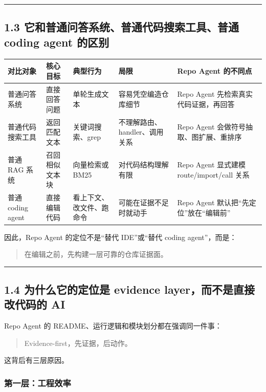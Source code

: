 \documentclass[UTF8,12pt,openany]{ctexbook}
\begin{document}
\hrule

\subsection{1.3 它和普通问答系统、普通代码搜索工具、普通 coding agent 的区别}

\begin{center}
\small
\begin{longtable}{|p{}|p{}|p{}|p{}|p{}|}
\toprule
对比对象 & 核心目标 & 典型行为 & 局限 & Repo Agent 的不同点 \\
\midrule
普通问答系统 & 直接回答问题 & 单轮生成文本 & 容易凭空编造仓库细节 & Repo Agent 先检索真实代码证据，再回答 \\
普通代码搜索工具 & 返回匹配文本 & 关键词搜索、grep & 不理解路由、handler、调用关系 & Repo Agent 会做符号抽取、图扩展、重排序 \\
普通 RAG 系统 & 召回相似文本块 & 向量检索或 BM25 & 对代码结构理解有限 & Repo Agent 显式建模 route/import/call 关系 \\
普通 coding agent & 直接编辑代码 & 看上下文、改文件、跑命令 & 可能在证据不足时就动手 & Repo Agent 默认把“先定位”放在“编辑前” \\
\bottomrule
\end{longtable}
\end{center}

因此，Repo Agent 的定位不是“替代 IDE”或“替代 coding agent”，而是：\par

\begin{quote}
在编辑之前，先构建一层可靠的仓库证据面。
\end{quote}

\hrule

\subsection{1.4 为什么它的定位是 evidence layer，而不是直接改代码的 AI}

Repo Agent 的 README、运行逻辑和模块划分都在强调同一件事：\par

\begin{quote}
Evidence-first，先证据，后动作。
\end{quote}

这背后有三层原因。\par

\subsubsection{第一层：工程效率}
\end{document}

